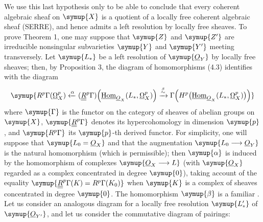 We use this last hypothesis only to be able to conclude that every coherent algebraic
sheaf on $\symup{X}$ is a quotient of a locally free coherent algebraic sheaf (SERRE),
and hence admits a left resolution by locally free sheaves. To prove Theorem 1,
one may suppose that $\symup{Z}$ and $\symup{Z'}$ are irreducible nonsingular subvarieties $\symup{Y}$
and $\symup{Y'}$ meeting transversely. Let $\symup{L_{*}}$ be a left resolution of $\symup{\Osh_Y}$ by
locally free sheaves; then, by Proposition 3, the diagram of homomorphisms (4.3)
identifies with the diagram
\[
\symup{R^{p}\Gamma(\underline{\Omega}_X^{p})
\xleftarrow{\alpha}
(\underline{\underline{R}}^{p}\Gamma)\!\left(\Homsh_{\Osh_X}(L_{*},\underline{\Omega}_X^{p})\right)
\xrightarrow{\overset{\beta}{\sim}}
\Gamma\!\left(H^{p}\bigl(\Homsh_{\Osh_X}(L_{*},\underline{\Omega}_X^{p})\bigr)\right)}
\]
where $\symup{\Gamma}$ is the  functor on the category of sheaves of
abelian groups on $\symup{X}$, $\symup{\underline{\underline{R}}^{p}\Gamma}$ denotes its hypercohomology in
dimension $\symup{p}$, and $\symup{R^{p}\Gamma}$ its $\symup{p}$-th derived functor. For simplicity, one
will suppose that $\symup{L_0=\Osh_X}$ and that the augmentation
$\symup{L_0\longrightarrow\Osh_Y}$ is the natural homomorphism (which is permissible);
then $\symup{\alpha}$ is induced by the homomorphism of complexes
$\symup{\Osh_X\longrightarrow L}$ (with $\symup{\Osh_X}$ regarded as a complex concentrated
in degree $\symup{0}$), taking account of the equality
$\symup{\underline{\underline{R}}^{p}\Gamma(K)=R^{p}\Gamma(K_0)}$ when $\symup{K}$ is a complex of sheaves
concentrated in degree $\symup{0}$. The homomorphism $\symup{\beta}$ is a familiar . Let us consider an analogous diagram for a locally free resolution
$\symup{L'_{*}}$ of $\symup{\Osh_{Y'}}$, and let us consider the commutative diagram of pairings:

